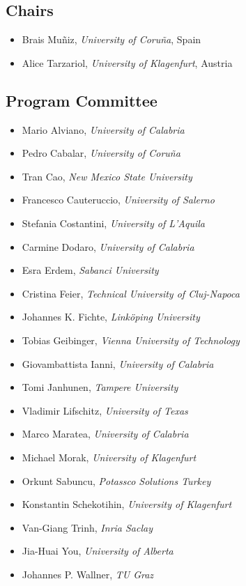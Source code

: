 \documentclass[
]{ceurart}
\begin{document}

\subsection*{Chairs}
\begin{itemize}
 \item Brais Muñiz, \emph{University of Coru\~na}, Spain
 \item Alice Tarzariol, \emph{University of Klagenfurt}, Austria
\end{itemize}


\subsection*{Program Committee}
\begin{itemize}
  \item Mario Alviano, \emph{University of Calabria}
  \item Pedro Cabalar, \emph{University of Coru\~na}
  \item Tran Cao, \emph{New Mexico State University}
  \item Francesco Cauteruccio, \emph{University of Salerno}
  \item Stefania Costantini, \emph{University of L'Aquila}
  \item Carmine Dodaro, \emph{University of Calabria}
  \item Esra Erdem, \emph{Sabanci University}
  \item Cristina Feier, \emph{Technical University of Cluj-Napoca}
  \item Johannes K. Fichte, \emph{Linköping University}
  \item Tobias Geibinger, \emph{Vienna University of Technology}
  \item Giovambattista Ianni, \emph{University of Calabria}
  \item Tomi Janhunen, \emph{Tampere University}
  \item Vladimir Lifschitz, \emph{University of Texas}
  \item Marco Maratea, \emph{University of Calabria}
  \item Michael Morak, \emph{University of Klagenfurt}
  \item Orkunt Sabuncu, \emph{Potassco Solutions Turkey}
  \item Konstantin Schekotihin, \emph{University of Klagenfurt}
  \item Van-Giang Trinh, \emph{Inria Saclay}
  \item Jia-Huai You, \emph{University of Alberta}
  \item Johannes P. Wallner, \emph{TU Graz}
\end{itemize}
\end{document}
